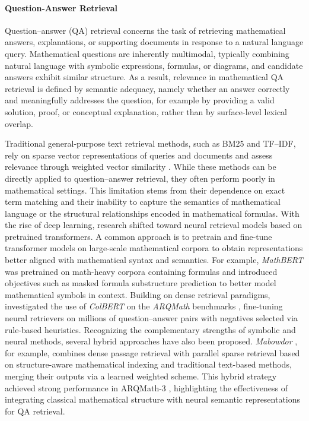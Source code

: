 \documentclass[11pt]{article}
\numberwithin{equation}{section}
\begin{document}
\paragraph{Question-Answer Retrieval}

Question–answer (QA) retrieval concerns the task of retrieving mathematical answers, explanations, or supporting documents in response to a natural language query. Mathematical questions are inherently multimodal, typically combining natural language with symbolic expressions, formulas, or diagrams, and candidate answers exhibit similar structure. As a result, relevance in mathematical QA retrieval is defined by semantic adequacy, namely whether an answer correctly and meaningfully addresses the question, for example by providing a valid solution, proof, or conceptual explanation, rather than by surface-level lexical overlap.

Traditional general-purpose text retrieval methods, such as BM25 \cite{robertson1995okapi,10.1561/1500000019} and TF–IDF, rely on sparse vector representations of queries and documents and assess relevance through weighted vector similarity \cite{SALTON1988513}. While these methods can be directly applied to question–answer retrieval, they often perform poorly in mathematical settings. This limitation stems from their dependence on exact term matching and their inability to capture the semantics of mathematical language or the structural relationships encoded in mathematical formulas. With the rise of deep learning, research shifted toward neural retrieval models based on pretrained transformers. A common approach is to pretrain and fine-tune transformer models on large-scale mathematical corpora to obtain representations better aligned with mathematical syntax and semantics. For example, \textit{MathBERT} \cite{peng2021mathbert} was pretrained on math-heavy corpora containing formulas and introduced objectives such as masked formula substructure prediction to better model mathematical symbols in context. Building on dense retrieval paradigms, \cite{reusch2021tu_dbs} investigated the use of \textit{ColBERT} \cite{khattab2020colbert} on the \textit{ARQMath} benchmarks \cite{10.1007/978-3-030-85251-1_17,10.1007/978-3-030-58219-7_15}, fine-tuning neural retrievers on millions of question–answer pairs with negatives selected via rule-based heuristics. Recognizing the complementary strengths of symbolic and neural methods, several hybrid approaches have also been proposed. \textit{Mabowdor} \cite{10.1145/3539618.3591746}, for example, combines dense passage retrieval with parallel sparse retrieval based on structure-aware mathematical indexing and traditional text-based methods, merging their outputs via a learned weighted scheme. This hybrid strategy achieved strong performance in ARQMath-3 \cite{Mansouri2022OverviewOA}, highlighting the effectiveness of integrating classical mathematical structure with neural semantic representations for QA retrieval.
\end{document}

